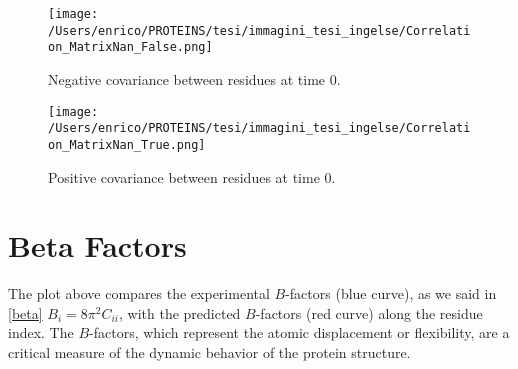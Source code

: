 \documentclass[English, Lau, oneside]{sapthesis}
\begin{document}
\begin{figure}[h!]
    \centering
    \texttt{[image: /Users/enrico/PROTEINS/tesi/immagini\_tesi\_ingelse/Correlation\_MatrixNan\_False.png]}
    \caption{Negative covariance between residues at time 0.}
\end{figure}
\begin{figure}[h!]
    \centering
    \texttt{[image: /Users/enrico/PROTEINS/tesi/immagini\_tesi\_ingelse/Correlation\_MatrixNan\_True.png]}
    \caption{Positive covariance between residues at time 0.}
\end{figure}

\newpage
\section*{Beta Factors}
\noindent The plot above compares the experimental \( B \)-factors (blue curve), as we said in \eqref{beta} $B_i = 8\pi^2 C_{ii}$, with the predicted \( B \)-factors (red curve) along the residue index. The \( B \)-factors, which represent the atomic displacement or flexibility, are a critical measure of the dynamic behavior of the protein structure.
\end{document}
